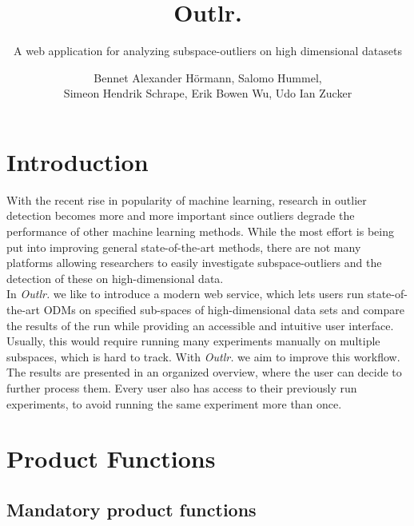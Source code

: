\documentclass[11pt, english]{scrartcl}
\title{{\myfont Outlr\textcolor[HTML]{925FF0}{.}}}
\subtitle{A web application for analyzing \glspl*{subspace-outlier} on high dimensional datasets}
\author{Bennet Alexander Hörmann, Salomo Hummel,\\
Simeon Hendrik Schrape, Erik Bowen Wu, Udo Ian Zucker}
\begin{document}
\maketitle
\pagebreak
\tableofcontents
\newpage


\section{Introduction}
With the recent rise in popularity of machine learning, research in outlier detection becomes more and more important since outliers degrade the performance of other machine learning methods. While the most effort is being put into improving general state-of-the-art methods, there are not many platforms allowing researchers to easily investigate \glspl{subspace-outlier} and the detection of these on high-dimensional data.\\
In \emph{Outlr.} we like to introduce a modern web service, which lets users run state-of-the-art \glspl{ODM} on specified sub-spaces of high-dimensional data sets and compare the results of the run while providing an accessible and intuitive user interface. Usually, this would require running many \glspl{experiment} manually on multiple \glspl{subspace}, which is hard to track.
With \emph{Outlr.} we aim to improve this workflow.\newline
The results are presented in an organized overview,
where the user can decide to further process them. Every user also has access to their previously run \glspl{experiment}, to avoid running the same \gls{experiment} more than once.
\newpage

\section{Product Functions}

\subsection*{Mandatory product functions}

\end{document}
